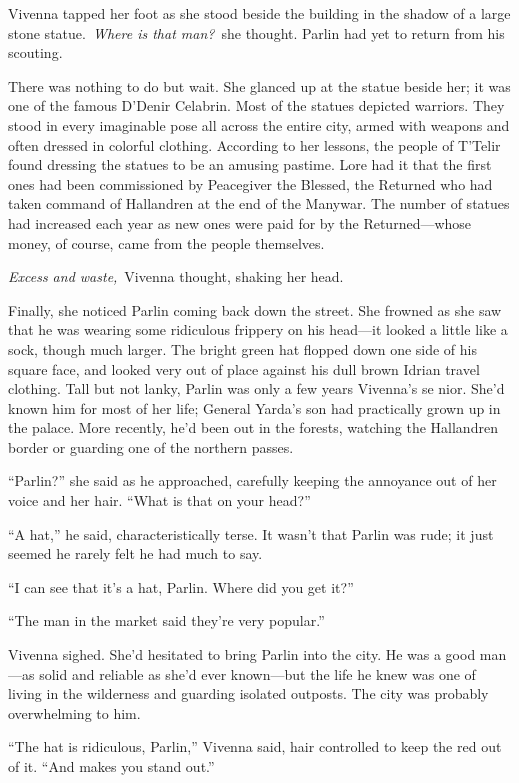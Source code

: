 Vivenna tapped her foot as she stood beside the building in the shadow of a large stone statue.~\textit{Where is that man?}~she thought. Parlin had yet to return from his scouting.

There was nothing to do but wait. She glanced up at the statue beside her; it was one of the famous D’Denir Celabrin. Most of the statues depicted warriors. They stood in every imaginable pose all across the entire city, armed with weapons and often dressed in colorful clothing. According to her lessons, the people of T’Telir found dressing the statues to be an amusing pastime. Lore had it that the first ones had been commissioned by Peacegiver the Blessed, the Returned who had taken command of Hallandren at the end of the Manywar. The number of statues had increased each year as new ones were paid for by the Returned—whose money, of course, came from the people themselves.

\textit{Excess and waste,}~Vivenna thought, shaking her head.

Finally, she noticed Parlin coming back down the street. She frowned as she saw that he was wearing some ridiculous frippery on his head—it looked a little like a sock, though much larger. The bright green hat flopped down one side of his square face, and looked very out of place against his dull brown Idrian travel clothing. Tall but not lanky, Parlin was only a few years Vivenna’s se nior. She’d known him for most of her life; General Yarda’s son had practically grown up in the palace. More recently, he’d been out in the forests, watching the Hallandren border or guarding one of the northern passes.

“Parlin?” she said as he approached, carefully keeping the annoyance out of her voice and her hair. “What is that on your head?”

“A hat,” he said, characteristically terse. It wasn’t that Parlin was rude; it just seemed he rarely felt he had much to say.

“I can see that it’s a hat, Parlin. Where did you get it?”

“The man in the market said they’re very popular.”

Vivenna sighed. She’d hesitated to bring Parlin into the city. He was a good man—as solid and reliable as she’d ever known—but the life he knew was one of living in the wilderness and guarding isolated outposts. The city was probably overwhelming to him.

“The hat is ridiculous, Parlin,” Vivenna said, hair controlled to keep the red out of it. “And makes you stand out.”

